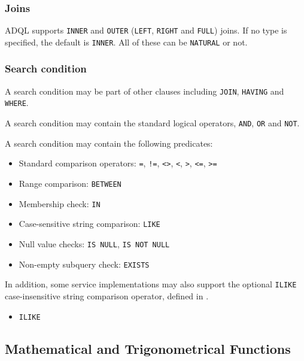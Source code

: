 \documentclass[11pt,a4paper]{ivoa}
\begin{document}
\subsubsection{Joins}
\label{sec:joins}

ADQL supports \verb:INNER: and \verb:OUTER:
(\verb:LEFT:, \verb:RIGHT: and \verb:FULL:) joins. If no type is specified, the
default is \verb:INNER:. All of these can be \verb:NATURAL: or not.


\subsubsection{Search condition}
\label{sec:search}

A search condition may be part of other clauses including \verb:JOIN:, \verb:HAVING: and \verb:WHERE:.

A search condition may contain the standard logical operators, \verb:AND:, \verb:OR: and \verb:NOT:.

A search condition may contain the following predicates:

\begin{itemize}
    \item Standard comparison operators: \verb:=:, \verb:!=:, \verb:<>:, \verb:<:, \verb:>:, \verb:<=:, \verb:>=:
    \item Range comparison: \verb:BETWEEN:
    \item Membership check: \verb:IN:
    \item Case-sensitive string comparison: \verb:LIKE:
    \item Null value checks: \verb:IS NULL:, \verb:IS NOT NULL:
    \item Non-empty subquery check: \verb:EXISTS:
\end{itemize}

In addition, some service implementations may also support the optional \verb:ILIKE:
case-insensitive string comparison operator, defined in .

\begin{itemize}
    \item \verb:ILIKE:
\end{itemize}

\subsection{Mathematical and Trigonometrical Functions}
\label{sec:math.functions}
\end{document}
